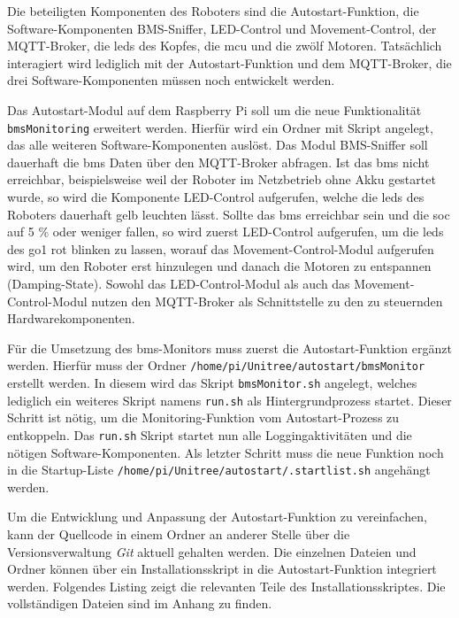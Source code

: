 \noindent Die beteiligten Komponenten des Roboters sind die Autostart-Funktion, die Software-Komponenten BMS-Sniffer, LED-Control
und Movement-Control, der MQTT-Broker, die \glspl{led} des Kopfes, die \gls{mcu} und die zwölf Motoren.
Tatsächlich interagiert wird lediglich mit der Autostart-Funktion und dem MQTT-Broker, die drei Software-Komponenten müssen
noch entwickelt werden.

Das Autostart-Modul auf dem Raspberry Pi soll um die neue Funktionalität \texttt{bmsMonitoring} erweitert werden.
Hierfür wird ein Ordner mit Skript angelegt, das alle weiteren Software-Komponenten auslöst.
Das Modul BMS-Sniffer soll dauerhaft die \gls{bms} Daten über den MQTT-Broker abfragen.
Ist das \gls{bms} nicht erreichbar, beispielsweise weil der Roboter im Netzbetrieb ohne Akku gestartet wurde,
so wird die Komponente LED-Control aufgerufen, welche die \glspl{led} des Roboters dauerhaft gelb leuchten lässt.
Sollte das \gls{bms} erreichbar sein und die \gls{soc} auf \num{5} \% oder weniger fallen, so wird zuerst LED-Control
aufgerufen, um die \glspl{led} des \gls{go1} rot blinken zu lassen, worauf das Movement-Control-Modul aufgerufen wird,
um den Roboter erst hinzulegen und danach die Motoren zu entspannen (Damping-State).
Sowohl das LED-Control-Modul als auch das Movement-Control-Modul nutzen den MQTT-Broker als Schnittstelle zu den zu steuernden
Hardwarekomponenten.


Für die Umsetzung des \gls{bms}-Monitors muss zuerst die Autostart-Funktion ergänzt werden.
Hierfür muss der Ordner \texttt{/home/\allowbreak pi/\allowbreak Unitree/\allowbreak autostart/\allowbreak bmsMonitor}
erstellt werden.
In diesem wird das Skript \texttt{bmsMonitor.sh} angelegt, welches lediglich ein weiteres Skript namens \texttt{run.sh}
als Hintergrundprozess startet.
Dieser Schritt ist nötig, um die Monitoring-Funktion vom Autostart-Prozess zu entkoppeln.
Das \texttt{run.sh} Skript startet nun alle Loggingaktivitäten und die nötigen Software-Komponenten.
Als letzter Schritt muss die neue Funktion noch in die Startup-Liste
\texttt{/home/pi/Unitree/autostart/.startlist.sh}
angehängt werden.

Um die Entwicklung und Anpassung der Autostart-Funktion zu vereinfachen, kann der Quellcode in einem Ordner an anderer
Stelle über die Versionsverwaltung \emph{Git} aktuell gehalten werden.
Die einzelnen Dateien und Ordner können über ein Installationsskript in die Autostart-Funktion integriert werden.
Folgendes Listing zeigt die relevanten Teile des Installationsskriptes.
Die vollständigen Dateien sind im Anhang zu finden.

